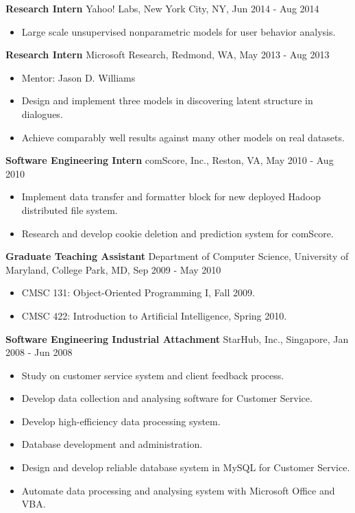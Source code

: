   {\bf Research Intern} \hfill Yahoo! Labs, New York City, NY, Jun 2014 - Aug 2014
  \begin{itemize}
  \item Large scale unsupervised nonparametric models for user behavior analysis.
  \end{itemize}

  {\bf Research Intern} \hfill Microsoft Research, Redmond, WA, May 2013 - Aug 2013
  \begin{itemize}
  \item Mentor: Jason D. Williams
  \item Design and implement three models in discovering latent structure in dialogues.
  \item Achieve comparably well results against many other models on real datasets.
  \end{itemize}

  {\bf Software Engineering Intern} \hfill comScore, Inc., Reston, VA, May 2010 - Aug 2010
  \begin{itemize}
  \item Implement data transfer and formatter block for new deployed Hadoop distributed file system.
  \item Research and develop cookie deletion and prediction system for comScore.
  \end{itemize}

  {\bf Graduate Teaching Assistant} \hfill Department of Computer Science, University of Maryland, College Park, MD, Sep 2009 - May 2010
  \begin{itemize}
  \item CMSC 131: Object-Oriented Programming I, Fall 2009.
  \item CMSC 422: Introduction to Artificial Intelligence, Spring 2010.
  \end{itemize}
  
  {\bf Software Engineering Industrial Attachment} \hfill StarHub, Inc., Singapore, Jan 2008 - Jun 2008
  \begin{itemize}
  \item Study on customer service system and client feedback process.
  \item Develop data collection and analysing software for Customer Service.
  \item Develop high-efficiency data processing system.
  \item Database development and administration.
  \item Design and develop reliable database system in MySQL for Customer Service.
  \item Automate data processing and analysing system with Microsoft Office and VBA.
  \end{itemize}

